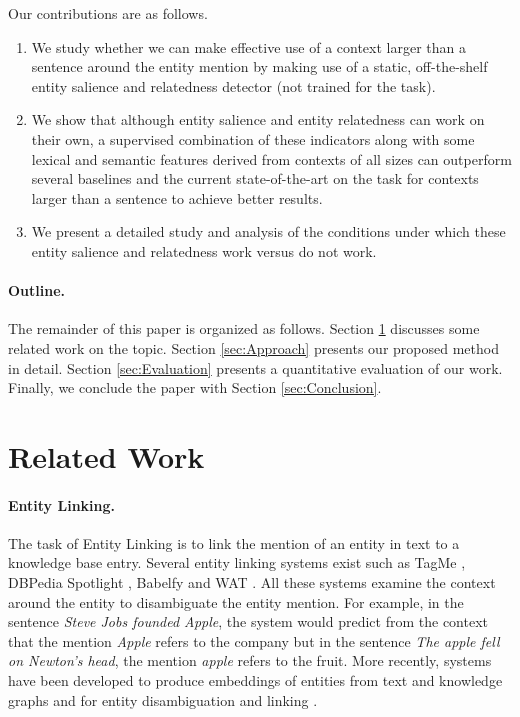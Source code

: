\documentclass[sigconf,authordraft]{acmart}
\begin{document}
Our contributions are as follows.
\begin{enumerate}

    \item We study whether we can make effective use of a context larger than a sentence around the entity mention by making use of a static, off-the-shelf entity salience and relatedness detector (not trained for the task). 
    \item We show that although entity salience and entity relatedness can work on their own, a supervised combination of these indicators along with some lexical and semantic features derived from contexts of all sizes can outperform several baselines and the current state-of-the-art on the task for contexts larger than a sentence to achieve better results.
    \item We present a detailed study and analysis of the conditions under which these entity salience and relatedness work versus do not work. 
\end{enumerate}

\paragraph{\textbf{Outline.}} The remainder of this paper is organized as follows. Section \ref{sec:Related Work} discusses some related work on the topic. Section \ref{sec:Approach} presents our proposed method in detail. Section \ref{sec:Evaluation} presents a quantitative evaluation of our work. Finally, we conclude the paper with Section \ref{sec:Conclusion}.


\section{Related Work}
\label{sec:Related Work}
\paragraph{\textbf{Entity Linking.}}
The task of Entity Linking is to link the mention of an entity in text to a knowledge base entry. Several entity linking systems exist such as TagMe \cite{ferragina2010tagme}, DBPedia Spotlight \cite{mendes2011dbpedia}, Babelfy \cite{babelfy} and WAT \cite{piccinno2014wat}. All these systems examine the context around the entity to disambiguate the entity mention. 
For example, in the sentence \textit{Steve Jobs founded Apple}, the system would predict from the context that the mention \textit{Apple} refers to the company but in the sentence \textit{The apple fell on Newton's head}, the mention \textit{apple} refers to the fruit. 
More recently, systems have been developed to produce embeddings of entities from text and knowledge graphs \cite{huang2015leveraging,ristoski2016rdf2vec,yamada2016joint} and for entity disambiguation and linking \cite{yamada2017learning}. 
\end{document}
